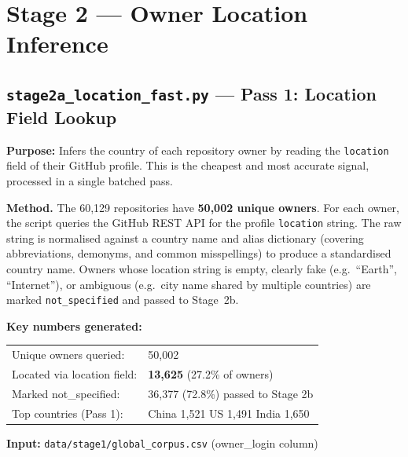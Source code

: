 \documentclass[11pt,a4paper]{article}
\begin{document}
\newpage

\section{Stage 2 --- Owner Location Inference}

\subsection*{\texttt{stage2a\_location\_fast.py} --- Pass 1: Location Field Lookup}

\begin{infobox}
\textbf{Purpose:} Infers the country of each repository owner by reading
the \texttt{location} field of their GitHub profile. This is the cheapest
and most accurate signal, processed in a single batched pass.
\end{infobox}

\textbf{Method.}
The 60,129 repositories have \textbf{50,002 unique owners}. For each owner,
the script queries the GitHub REST API for the profile \texttt{location}
string. The raw string is normalised against a country name and alias
dictionary (covering abbreviations, demonyms, and common misspellings)
to produce a standardised country name. Owners whose location string is
empty, clearly fake (e.g.\ ``Earth'', ``Internet''), or ambiguous
(e.g.\ city name shared by multiple countries) are marked
\texttt{not\_specified} and passed to Stage~2b.

\begin{numbersbox}
\textbf{Key numbers generated:}\\[2pt]
\begin{tabular}{@{}ll@{}}
Unique owners queried:           & 50,002 \\
Located via location field:      & \textbf{13,625} (27.2\% of owners) \\
Marked not\_specified:           & 36,377 (72.8\%) passed to Stage 2b \\
Top countries (Pass 1):          & China 1,521 \quad US 1,491 \quad India 1,650 \\
\end{tabular}
\end{numbersbox}

\textbf{Input:} \texttt{data/stage1/global\_corpus.csv} (owner\_login column)
\end{document}
